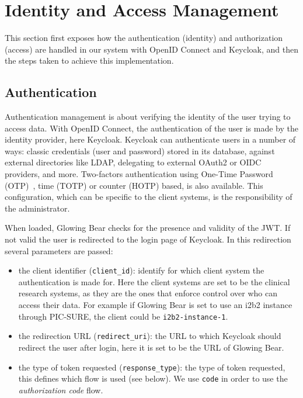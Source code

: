 \section{Identity and Access Management}
\label{sec:interoplayer-idp}

This section first exposes how the authentication (identity) and authorization (access) are handled in our system with OpenID Connect and Keycloak, and then the steps taken to achieve this implementation.

\subsection{Authentication}

Authentication management is about verifying the identity of the user trying to access data.
With OpenID Connect, the authentication of the user is made by the identity provider, here Keycloak.
Keycloak can authenticate users in a number of ways: classic credentials (user and password) stored in its database, against external directories like LDAP, delegating to external OAuth2 or OIDC providers, and more.
Two-factors authentication using One-Time Password (OTP)~\cite{rayes2011one}, time (TOTP) or counter (HOTP) based, is also available.
This configuration, which can be specific to the client systems, is the responsibility of the administrator. 

When loaded, Glowing Bear checks for the presence and validity of the JWT. 
If not valid the user is redirected to the login page of Keycloak. 
In this redirection several parameters are passed:

\begin{itemize}
    \item the client identifier (\verb|client_id|): identify for which client system the authentication is made for.
    Here the client systems are set to be the clinical research systems, as they are the ones that enforce control over who can access their data. For example if Glowing Bear is set to use an i2b2 instance through PIC-SURE, the client could be \verb|i2b2-instance-1|.
    \item the redirection URL (\verb|redirect_uri|): the URL to which Keycloak should redirect the user after login, here it is set to be the URL of Glowing Bear.
    \item the type of token requested (\verb|response_type|): the type of token requested, this defines which flow is used (see below). We use \verb|code| in order to use the \emph{authorization code} flow.
\end{itemize}

